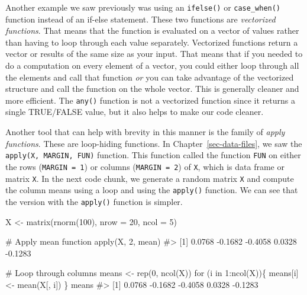 \documentclass[
  letterpaper,
]{latex/krantz}
\makeatletter
\newenvironment{Shaded}{\begin{snugshade}}{\end{snugshade}}
\newcommand{\AttributeTok}[1]{\textcolor[rgb]{0.40,0.45,0.13}{#1}}
\newcommand{\CommentTok}[1]{\textcolor[rgb]{0.37,0.37,0.37}{#1}}
\newcommand{\ControlFlowTok}[1]{\textcolor[rgb]{0.00,0.23,0.31}{#1}}
\newcommand{\DecValTok}[1]{\textcolor[rgb]{0.68,0.00,0.00}{#1}}
\newcommand{\FunctionTok}[1]{\textcolor[rgb]{0.28,0.35,0.67}{#1}}
\newcommand{\NormalTok}[1]{\textcolor[rgb]{0.00,0.23,0.31}{#1}}
\newcommand{\OtherTok}[1]{\textcolor[rgb]{0.00,0.23,0.31}{#1}}
\newcommand{\SpecialCharTok}[1]{\textcolor[rgb]{0.37,0.37,0.37}{#1}}
\newenvironment{kframe}{%
\medskip{}
\setlength{\fboxsep}{.8em}
 \def\at@end@of@kframe{}%
 \ifinner\ifhmode%
  \def\at@end@of@kframe{\end{minipage}}%
  \begin{minipage}{\columnwidth}%
 \fi\fi%
 \def\FrameCommand##1{\hskip\@totalleftmargin \hskip-\fboxsep
 \colorbox{shadecolor}{##1}\hskip-\fboxsep
     \hskip-\linewidth \hskip-\@totalleftmargin \hskip\columnwidth}%
 \MakeFramed {\advance\hsize-\width
   \@totalleftmargin\z@ \linewidth\hsize
   \@setminipage}}%
 {\par\unskip\endMakeFramed%
 \at@end@of@kframe}
\renewenvironment{Shaded}{\begin{kframe}}{\end{kframe}}
\makeatother
\begin{document}
Another example we saw previously was using an \texttt{ifelse()} or
\texttt{case\_when()} function instead of an if-else statement. These
two functions are \emph{vectorized
functions}. That means that the function is
evaluated on a vector of values rather than having to loop through each
value separately. Vectorized functions return a vector or results of the
same size as your input. That means that if you needed to do a
computation on every element of a vector, you could either loop through
all the elements and call that function \emph{or} you can take advantage
of the vectorized structure and call the function on the whole vector.
This is generally cleaner and more efficient. The \texttt{any()}
function is not a vectorized function since it returns a single
TRUE/FALSE value, but it also helps to make our code cleaner.

Another tool that can help with brevity in this manner is the family of
\emph{apply functions}. These are loop-hiding
functions. In Chapter~\ref{sec-data-files}, we saw the
\texttt{apply(X,\ MARGIN,\ FUN)}
function. This function called the function \texttt{FUN} on either the
rows (\texttt{MARGIN\ =\ 1}) or columns (\texttt{MARGIN\ =\ 2}) of
\texttt{X}, which is data frame or matrix \texttt{X}. In the next code
chunk, we generate a random matrix \texttt{X} and compute the column
means using a loop and using the \texttt{apply()} function. We can see
that the version with the \texttt{apply()} function is simpler.

\begin{Shaded}
\begin{Highlighting}[]
\NormalTok{X }\OtherTok{\textless{}{-}} \FunctionTok{matrix}\NormalTok{(}\FunctionTok{rnorm}\NormalTok{(}\DecValTok{100}\NormalTok{), }\AttributeTok{nrow =} \DecValTok{20}\NormalTok{, }\AttributeTok{ncol =} \DecValTok{5}\NormalTok{)}

\CommentTok{\# Apply mean function  }
\FunctionTok{apply}\NormalTok{(X, }\DecValTok{2}\NormalTok{, mean)}
\CommentTok{\#\textgreater{} [1]  0.0768 {-}0.1682 {-}0.4058  0.0328 {-}0.1283}

\CommentTok{\# Loop through columns}
\NormalTok{means }\OtherTok{\textless{}{-}} \FunctionTok{rep}\NormalTok{(}\DecValTok{0}\NormalTok{, }\FunctionTok{ncol}\NormalTok{(X))}
\ControlFlowTok{for}\NormalTok{ (i }\ControlFlowTok{in} \DecValTok{1}\SpecialCharTok{:}\FunctionTok{ncol}\NormalTok{(X))\{}
\NormalTok{  means[i] }\OtherTok{\textless{}{-}} \FunctionTok{mean}\NormalTok{(X[, i])}
\NormalTok{\}}
\NormalTok{means}
\CommentTok{\#\textgreater{} [1]  0.0768 {-}0.1682 {-}0.4058  0.0328 {-}0.1283}
\end{Highlighting}
\end{Shaded}
\end{document}
